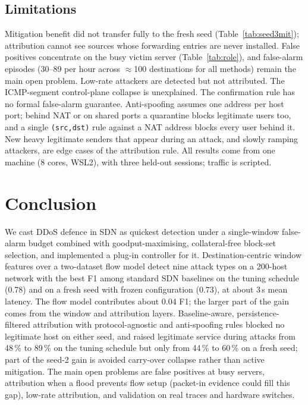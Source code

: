\documentclass[conference]{IEEEtran}
\begin{document}
\subsection{Limitations}\label{sec:limits}
Mitigation benefit did not transfer fully to the fresh seed (Table~\ref{tab:seed3mit}); attribution cannot see sources whose forwarding entries are never installed. False positives concentrate on the busy victim server (Table~\ref{tab:role}), and false-alarm episodes (30--89 per hour across $\approx$100 destinations for all methods) remain the main open problem. Low-rate attackers are detected but not attributed. The ICMP-segment control-plane collapse is unexplained. The confirmation rule has no formal false-alarm guarantee. Anti-spoofing assumes one address per host port; behind NAT or on shared ports a quarantine blocks legitimate users too, and a single \texttt{(src,dst)} rule against a NAT address blocks every user behind it. New heavy legitimate senders that appear during an attack, and slowly ramping attackers, are edge cases of the attribution rule. All results come from one machine (8 cores, WSL2), with three held-out sessions; traffic is scripted.

\section{Conclusion}
We cast DDoS defence in SDN as quickest detection under a single-window false-alarm budget combined with goodput-maximising, collateral-free block-set selection, and implemented a plug-in controller for it. Destination-centric window features over a two-dataset flow model detect nine attack types on a 200-host network with the best F1 among standard SDN baselines on the tuning schedule (0.78) and on a fresh seed with frozen configuration (0.73), at about 3\,s mean latency. The flow model contributes about 0.04 F1; the larger part of the gain comes from the window and attribution layers. Baseline-aware, persistence-filtered attribution with protocol-agnostic and anti-spoofing rules blocked no legitimate host on either seed, and raised legitimate service during attacks from 48\,\% to 89\,\% on the tuning schedule but only from 44\,\% to 60\,\% on a fresh seed; part of the seed-2 gain is avoided carry-over collapse rather than active mitigation. The main open problems are false positives at busy servers, attribution when a flood prevents flow setup (packet-in evidence could fill this gap), low-rate attribution, and validation on real traces and hardware switches.
\end{document}
